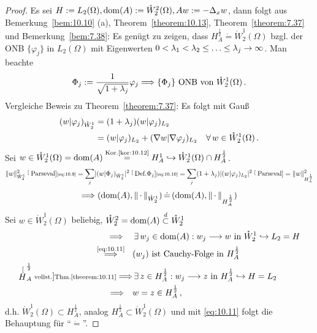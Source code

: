 \begin{proof}
Es sei $H:=L_2(\Omega), \operatorname{dom}(A) := \mathring W^2_2 (\Omega), Aw := -\Delta_x w$, dann folgt aus Bemerkung~\ref{bem:10.10} (a), Theorem~\ref{theorem:10.13}, Theorem~\ref{theorem:7.37} und Bemerkung~\ref{bem:7.38}: Es genügt zu zeigen, dass $H^{\frac 12}_A \dot = \mathring W^1_2(\Omega)$ bzgl. der ONB $\{\varphi_j\}$ in $L_2(\Omega)$ mit Eigenwerten $0< \lambda_1 < \lambda_2 \leq \ldots \leq \lambda_j \rightarrow \infty$. Man beachte
\begin{align}
\label{eq:10.9}
	\Phi_j := \frac 1{\sqrt{1+\lambda_j}}\varphi_j \Longrightarrow \{\Phi_j\} \text{ ONB von } \mathring W^1_2 (\Omega) \, .
\end{align}
Vergleiche Beweis zu Theorem~\ref{theorem:7.37}: Es folgt mit Gauß
\begin{align}
\label{eq:10.10}
	\begin{aligned}
	(w |\varphi_j)_{\mathring W^1_2} & = (1+\lambda_j) (w|\varphi_j)_{L_2} \\
	& = (w|\varphi_j)_{L_2} + (\nabla w |\nabla \varphi_j)_{L_2} \quad \forall \, w \in \mathring W^1_2(\Omega) \, .
	\end{aligned}
\end{align}
Sei $w \in \mathring W^1_2(\Omega) = \operatorname{dom}(A) \stackrel{\scriptsize\text{Kor.\ref{kor:10.12}}}= H^1_A \hookrightarrow \mathring W^1_2 (\Omega) \cap H^{\frac 1 2}_A$.
\begin{align*}
	\lVert w\rVert^2_{\mathring W^1_2} \stackrel[\scriptsize\text{Parseval}]{\scriptsize\eqref{eq:10.9}}= \sum_j \lvert (w|\Phi_j)_{\mathring W^1_2}\rvert^2 
	\stackrel[\scriptsize\text{Def.}\Phi_j]{\scriptsize\eqref{eq:10.10}}= \sum_j (1+\lambda_j) \lvert (w |\varphi_j)_{L_2}\rvert^2 \stackrel[\scriptsize\text{Parseval}]{}= \lVert w\rVert^2_{H^{\frac 12}_A}
\end{align*}	
\begin{align}
\label{eq:10.11}
	\Longrightarrow (\operatorname{dom}(A), \lVert \, \cdot \,\rVert_{\mathring W^1_2}) \, \dot = \, (\operatorname{dom}(A), \lVert \, \cdot \,\rVert_{H^{\frac 12}_A})
\end{align}
Sei $w \in \mathring W^1_2(\Omega)$ beliebig, $\mathring W^2_2 = \operatorname{dom}(A) \stackrel{\scriptsize d}\subset \mathring W^1_2$
\begin{align*}
	\Longrightarrow \hspace{1.1em}& \, \exists \, w_j \in \operatorname{dom} (A): w_j \longrightarrow w \text{ in } \mathring W^1_2 \hookrightarrow L_2 = H \\
	\stackrel{\scriptsize\eqref{eq:10.11}}{\Longrightarrow} \hspace{0.9em} & (w_j ) \text{ ist Cauchy-Folge in } H^{\frac 12 }_A \\
	\stackrel[H_A^{\frac 12 }\scriptsize\text{vollst.}]{\scriptsize\text{Thm.}\ref{theorem:10.11}}\Longrightarrow & \, \exists \, z \in H^{\frac 12}_A : w_j \longrightarrow z \text{ in } H_A^{\frac 12} \hookrightarrow H=L_2 \\
	\Longrightarrow  \hspace{1em}& w = z \in H^{\frac 12}_A \, , 
\end{align*}
d.h. $\mathring W^1_2(\Omega) \subset H_A^{\frac 12}$, analog $H^{\frac 12}_A \subset \mathring W^1_2(\Omega)$ und mit \eqref{eq:10.11} folgt die Behauptung für "`$\dot =$"'.
\end{proof}


